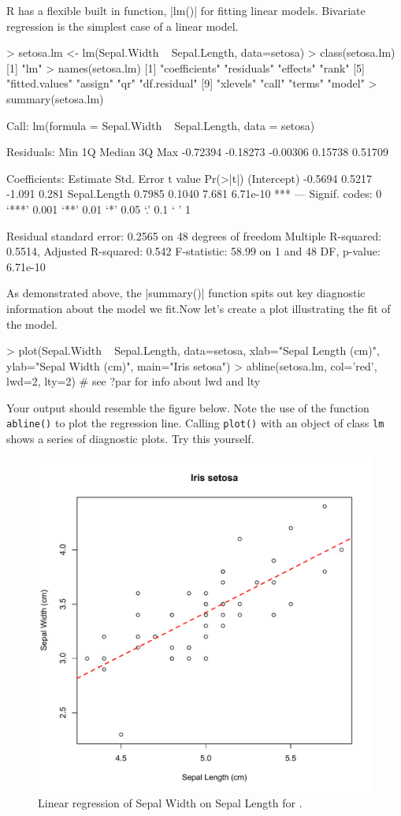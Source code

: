 R has a flexible built in function, |lm()| for fitting linear models. Bivariate regression is the simplest case of a linear model.
%
\begin{R}
> setosa.lm <- lm(Sepal.Width ~ Sepal.Length, data=setosa)
> class(setosa.lm)
[1] "lm"
> names(setosa.lm)
 [1] "coefficients"  "residuals"     "effects"       "rank"
 [5] "fitted.values" "assign"        "qr"            "df.residual"
 [9] "xlevels"       "call"          "terms"         "model"
> summary(setosa.lm)

Call:
lm(formula = Sepal.Width ~ Sepal.Length, data = setosa)

Residuals:
     Min       1Q   Median       3Q      Max
-0.72394 -0.18273 -0.00306  0.15738  0.51709

Coefficients:
             Estimate Std. Error t value Pr(>|t|)
(Intercept)   -0.5694     0.5217  -1.091    0.281
Sepal.Length   0.7985     0.1040   7.681 6.71e-10 ***
---
Signif. codes:  0 ‘***’ 0.001 ‘**’ 0.01 ‘*’ 0.05 ‘.’ 0.1 ‘ ’ 1

Residual standard error: 0.2565 on 48 degrees of freedom
Multiple R-squared: 0.5514, Adjusted R-squared: 0.542
F-statistic: 58.99 on 1 and 48 DF,  p-value: 6.71e-10
\end{R}
%
As demonstrated above, the |summary()| function spits out key diagnostic information about the model we fit.Now let's create a plot illustrating the fit of the model.
%
\begin{R}
> plot(Sepal.Width ~ Sepal.Length, data=setosa, xlab="Sepal Length (cm)", ylab="Sepal Width (cm)", main="Iris setosa")
> abline(setosa.lm, col='red', lwd=2, lty=2)  # see ?par for info about lwd and lty
\end{R}
Your output should resemble the figure below. Note the use of the function \lstinline!abline()! to plot the regression
line. Calling \lstinline!plot()! with an object of class \lstinline!lm!
shows a series of diagnostic plots. Try this yourself.
%
\begin{figure}[htbp]
\centering
\includegraphics[width=0.5\columnwidth]{./figures/hands-on2/regression.pdf}
\caption{Linear regression of Sepal Width on Sepal Length for .}
\end{figure}


